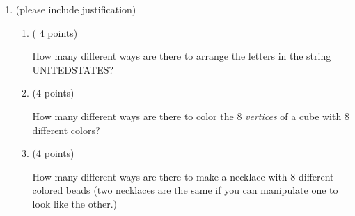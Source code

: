 \documentclass[10pt,letterpaper,unboxed,cm]{article}
\begin{document}
\begin{enumerate}
\begin{enumerate}
\begin{itemize}
\item
The number of strings of digits of length 8 with exactly one occurrence of 0.
\begin{quote}
(Reasoning:) The factor $8$ tells us which position the 0 is in and the factor $9^7$ tells us the rest of the 7 positions using the remaining 9 digits.
\end{quote}
\item
The number of strings of length 8 that start with a letter $\{A,B,C,D,E,F,G,H\}$ and end with 7 digits from 1 to 9.
\begin{quote}
(Reasoning:) The factor $8$ tells us which letter is in the first position and the factor $9^7$ tells us the rest of the 7 positions using the digits 1 to 9.
\end{quote}
\item
The number of strings of digits of length 8 that start with a digit $\{0,1,2,3,4,5,6,7\}$ does not repeat the same digit in two consecutive positions
\begin{quote}
(Reasoning:) The factor $8$ tells us which digit is in the first position and the factor $9^7$ tells us each of the next 7 positions using the remaining 9 digits that are different than the digit before.
\end{quote}
\end{itemize}

\begin{enumerate}
\item

$$26*8*10^7$$

\item

$$10^3(26 + 10)^{5}{8\choose 3}$$

\item

$$(26 + 10)^{8} - 26^8$$

\item
$$26^8 + 10^8 + 10^4*26^4$$
\end{enumerate}

\item
(please include justification)
\begin{enumerate}
\item
( 4 points)

How many different ways are there to arrange the letters in the string UNITEDSTATES?
\item
(4 points)

How many different ways are there to color the 8 \emph{vertices} of a cube with 8 different colors?


\item
(4 points)

How many different ways are there to make a necklace with 8 different colored beads (two necklaces are the same if you can manipulate one to look like the other.)


\end{enumerate}
\end{enumerate}
\end{enumerate}
\end{document}
